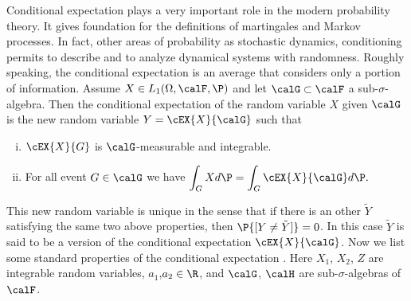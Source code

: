 
	Conditional expectation plays a very important role in the modern probability theory. It gives  
foundation for the definitions of martingales and Markov processes. In fact, other areas of probability 
as stochastic dynamics, conditioning permits to describe and to analyze dynamical systems with randomness.
Roughly speaking, the conditional expectation is an average that considers only a portion of information.
Assume $X\in L_1(\Omega,\calF,\P)$ and let $\calG \subset \calF$ a sub-$\sigma$-algebra. Then the
conditional expectation of the random variable $X$ given $\calG$ is the new random variable 
$Y = \cEX{X}{\calG}$ such that
\begin{enumerate}[(i)]
	\item
		$\cEX{X}{G}$ is $\calG$-measurable and integrable.
	\item
		For all event $G\in \calG$ we have 
		$
			\displaystyle
			\int_{G} X d\P = \int_{G} \cEX{X}{\calG}d\P.
		$
\end{enumerate}
	This new random variable is unique in the sense that if there is an other $\tilde{Y}$ satisfying
the same two above properties, then $\P{[Y\neq \tilde{Y}]}=0$. In this case $\tilde{Y}$ is said to be 
a version of the conditional expectation $\cEX{X}{\calG}$.
Now we list some standard properties of the conditional expectation \cite{Williams1991}.
Here $X_1$, $X_2$, $Z$ are integrable random variables, $a_1$,$a_2\in \R$, and $\calG$, $\calH$ 
are sub-$\sigma$-algebras of $\calF$.

